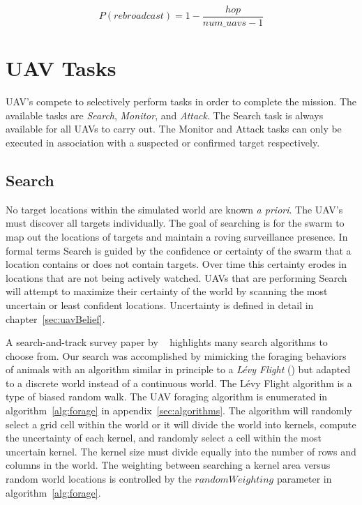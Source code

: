 \begin{equation}
\label{eq:probFlood}
P(rebroadcast) = 1 - \frac{hop}{num\_uavs - 1}
\end{equation}

\section{UAV Tasks}
UAV's compete to selectively perform tasks in order to complete the mission.  The available tasks are \textit{Search}, \textit{Monitor}, and \textit{Attack}.  The Search task is always available for all UAVs to carry out.  The Monitor and Attack tasks can only be executed in association with a suspected or confirmed target respectively.

\subsection{Search}
No target locations within the simulated world are known \textit{a priori}.  The UAV's must discover all targets individually.  The goal of searching is for the swarm to map out the locations of targets and maintain a roving surveillance presence. In formal terms Search is guided by the confidence or certainty of the swarm that a location contains or does not contain targets.  Over time this certainty erodes in locations that are not being actively watched.  UAVs that are performing Search will attempt to maximize their certainty of the world by scanning the most uncertain or least confident locations.  Uncertainty is defined in detail in chapter~\ref{sec:uavBelief}.

A search-and-track survey paper by ~\cite{senanayake} highlights many search algorithms to choose from. Our search was accomplished by mimicking the foraging behaviors of animals with an algorithm similar in principle to a \textit{L\'evy Flight} (\cite{humphries}) but adapted to a discrete world instead of a continuous world.  The L\'evy Flight algorithm is a type of biased random walk.  The UAV foraging algorithm is enumerated in algorithm~\ref{alg:forage} in appendix~\ref{sec:algorithms}.  The algorithm will randomly select a grid cell within the world or it will divide the world into kernels, compute the uncertainty of each kernel, and randomly select a cell within the most uncertain kernel.  The kernel size must divide equally into the number of rows and columns in the world.  The weighting between searching a kernel area versus random world locations is controlled by the $randomWeighting$ parameter in algorithm~\ref{alg:forage}.

